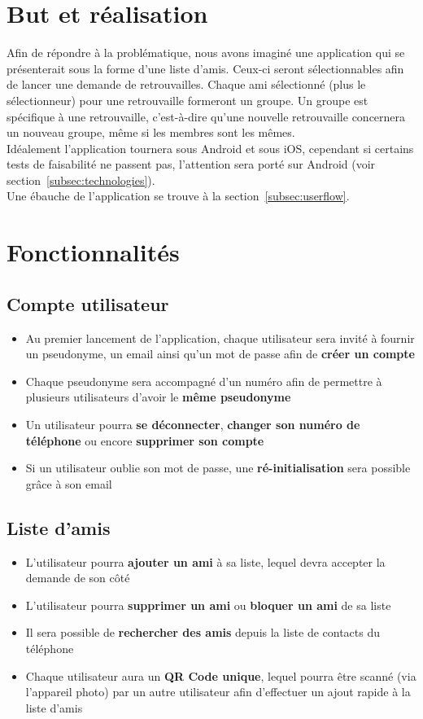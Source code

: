 \documentclass[french]{article}
\begin{document}
	\section{But et réalisation}
		Afin de répondre à la problématique, nous avons imaginé une application qui se présenterait sous la forme d'une liste d'amis. Ceux-ci seront sélectionnables afin de lancer une demande de retrouvailles. Chaque ami sélectionné (plus le sélectionneur) pour une retrouvaille formeront un groupe. Un groupe est spécifique à une retrouvaille, c'est-à-dire qu'une nouvelle retrouvaille concernera un nouveau groupe, même si les membres sont les mêmes.\\
		
		Idéalement l'application tournera sous Android et sous iOS, cependant si certains tests de faisabilité ne passent pas, l'attention sera porté sur Android (voir section~\ref{subsec:technologies}).\\
		
		Une ébauche de l'application se trouve à la section~\ref{subsec:userflow}.
	
	\section{Fonctionnalités}
		\subsection{Compte utilisateur}
			\begin{itemize}
				\item Au premier lancement de l'application, chaque utilisateur sera invité à fournir un pseudonyme, un email ainsi qu'un mot de passe afin de \textbf{créer un compte} 
				\item Chaque pseudonyme sera accompagné d'un numéro afin de permettre à plusieurs utilisateurs d'avoir le \textbf{même pseudonyme}
				\item Un utilisateur pourra \textbf{se déconnecter}, \textbf{changer son numéro de téléphone} ou encore \textbf{supprimer son compte}
				\item Si un utilisateur oublie son mot de passe, une \textbf{ré-initialisation} sera possible grâce à son email
			\end{itemize}
	
		\subsection{Liste d'amis}
			\begin{itemize}
				\item L'utilisateur pourra \textbf{ajouter un ami} à sa liste, lequel devra accepter la demande de son côté
				\item L'utilisateur pourra \textbf{supprimer un ami} ou \textbf{bloquer un ami} de sa liste
				\item Il sera possible de \textbf{rechercher des amis} depuis la liste de contacts du téléphone
				\item Chaque utilisateur aura un \textbf{QR Code unique}, lequel pourra être scanné (via l'appareil photo) par un autre utilisateur afin d'effectuer un ajout rapide à la liste d'amis 
			\end{itemize}
		
\end{document}
